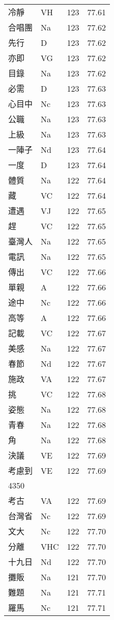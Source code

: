 \documentclass[twocolumn]{book}
\begin{document}
\begin{supertabular}{llrr}
冷靜 & VH & 123 &  77.61\\
合唱團 & Na & 123 &  77.62\\
先行 & D & 123 &  77.62\\
亦即 & VG & 123 &  77.62\\
目錄 & Na & 123 &  77.62\\
必需 & D & 123 &  77.63\\
心目中 & Nc & 123 &  77.63\\
公職 & Na & 123 &  77.63\\
上級 & Na & 123 &  77.63\\
一陣子 & Nd & 123 &  77.64\\
一度 & D & 123 &  77.64\\
體質 & Na & 122 &  77.64\\
藏 & VC & 122 &  77.64\\
遭遇 & VJ & 122 &  77.65\\
趕 & VC & 122 &  77.65\\
臺灣人 & Na & 122 &  77.65\\
電訊 & Na & 122 &  77.65\\
傳出 & VC & 122 &  77.66\\
單親 & A & 122 &  77.66\\
途中 & Nc & 122 &  77.66\\
高等 & A & 122 &  77.66\\
記載 & VC & 122 &  77.67\\
美感 & Na & 122 &  77.67\\
春節 & Nd & 122 &  77.67\\
施政 & VA & 122 &  77.67\\
挑 & VC & 122 &  77.68\\
姿態 & Na & 122 &  77.68\\
青春 & Na & 122 &  77.68\\
角 & Na & 122 &  77.68\\
決議 & VE & 122 &  77.69\\
考慮到 & VE & 122 &  77.69\\
4350\\
考古 & VA & 122 &  77.69\\
台灣省 & Nc & 122 &  77.69\\
文大 & Nc & 122 &  77.70\\
分離 & VHC & 122 &  77.70\\
十九日 & Nd & 122 &  77.70\\
攤販 & Na & 121 &  77.70\\
難題 & Na & 121 &  77.71\\
羅馬 & Nc & 121 &  77.71\\

\end{supertabular}
\end{document}
